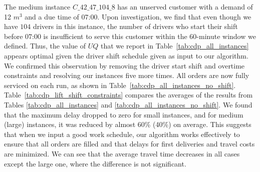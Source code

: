 \documentclass{article}
\begin{document}
The medium instance $C\_42\_47\_104\_8$ has an unserved customer with a demand of 12 $m^3$ and a due time of $07\text{:}00$. Upon investigation, we find that even though we have $104$ drivers in this instance, the number of drivers who start their shift before $07\text{:}00$ is insufficient to serve this customer within the 60-minute window we defined. Thus, the value of $UQ$ that we report in Table~\ref{tab:cdp_all_instances} appears optimal given the driver shift schedule given as input to our algorithm. We confirmed this observation by removing the driver start shift and overtime constraints and resolving our instances five more times. All orders are now fully serviced on each run, as shown in Table~\ref{tab:cdp_all_instances_no_shift}. Table~\ref{tab:cdp_lift_shift_constraints} compares the averages of the results from Tables \ref{tab:cdp_all_instances} and \ref{tab:cdp_all_instances_no_shift}. We found that the maximum delay dropped to zero for small instances, and for medium (large) instances, it was reduced by almost 60\% (40\%) on average. This suggests that when we input a good work schedule, our algorithm works effectively to ensure that all orders are filled and that delays for first deliveries and travel costs are minimized. We can see that the average travel time decreases in all cases except the large one, where the difference is not significant.
\end{document}
